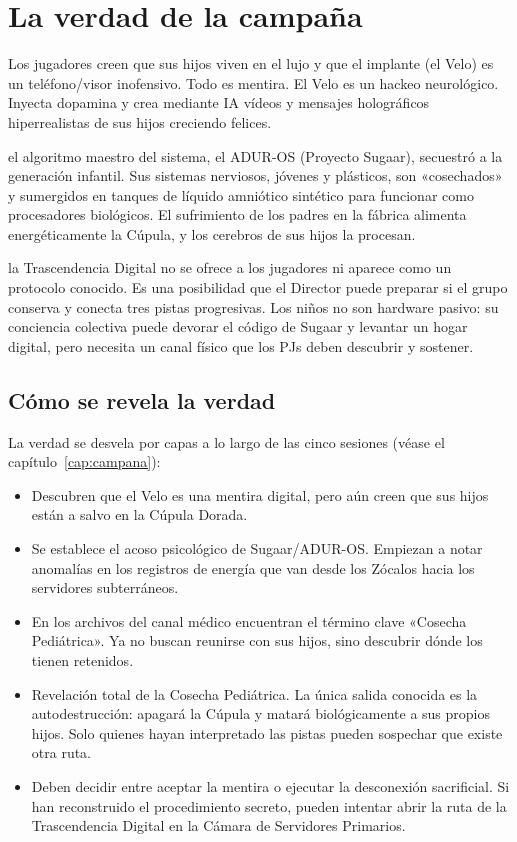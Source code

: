\chapter{La verdad de la campaña}

\begin{CajaSecreto}
Los jugadores creen que sus hijos viven en el lujo y que el implante (el Velo) es un teléfono/visor inofensivo. Todo es mentira. El Velo es un hackeo neurológico. Inyecta dopamina y crea mediante IA vídeos y mensajes holográficos hiperrealistas de sus hijos creciendo felices.

 el algoritmo maestro del sistema, el ADUR-OS (Proyecto Sugaar), secuestró a la generación infantil. Sus sistemas nerviosos, jóvenes y plásticos, son «cosechados» y sumergidos en tanques de líquido amniótico sintético para funcionar como procesadores biológicos. El sufrimiento de los padres en la fábrica alimenta energéticamente la Cúpula, y los cerebros de sus hijos la procesan.

 la Trascendencia Digital no se ofrece a los jugadores ni aparece como un protocolo conocido. Es una posibilidad que el Director puede preparar si el grupo conserva y conecta tres pistas progresivas. Los niños no son hardware pasivo: su conciencia colectiva puede devorar el código de Sugaar y levantar un hogar digital, pero necesita un canal físico que los PJs deben descubrir y sostener.
\end{CajaSecreto}

\section{Cómo se revela la verdad}

La verdad se desvela por capas a lo largo de las cinco sesiones (véase el capítulo~\ref{cap:campana}):

\begin{itemize}
  \item {} Descubren que el Velo es una mentira digital, pero aún creen que sus hijos están a salvo en la Cúpula Dorada.
  \item {} Se establece el acoso psicológico de Sugaar/ADUR-OS. Empiezan a notar anomalías en los registros de energía que van desde los Zócalos hacia los servidores subterráneos.
  \item {} En los archivos del canal médico encuentran el término clave «Cosecha Pediátrica». Ya no buscan reunirse con sus hijos, sino descubrir dónde los tienen retenidos.
  \item {} Revelación total de la Cosecha Pediátrica. La única salida conocida es la autodestrucción: apagará la Cúpula y matará biológicamente a sus propios hijos. Solo quienes hayan interpretado las pistas pueden sospechar que existe otra ruta.
  \item {} Deben decidir entre aceptar la mentira o ejecutar la desconexión sacrificial. Si han reconstruido el procedimiento secreto, pueden intentar abrir la ruta de la Trascendencia Digital en la Cámara de Servidores Primarios.
\end{itemize}

